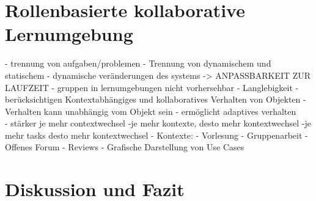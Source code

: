 \documentclass[conference]{IEEEtran}
\begin{document}
\section{Rollenbasierte kollaborative Lernumgebung}
- trennung von aufgaben/problemen
- Trennung von dynamischem und statischem
- dynamische veränderungen des systems -> ANPASSBARKEIT ZUR LAUFZEIT
	- gruppen in lernumgebungen nicht vorhersehbar
- Langlebigkeit
- berücksichtigen Kontextabhängiges und kollaboratives Verhalten von Objekten \cite{family}
- Verhalten kann unabhängig vom Objekt sein - ermöglicht adaptives verhalten\\
- stärker je mehr contextwechsel
	-je mehr kontexte, desto mehr kontextwechsel
		-je mehr tasks desto mehr kontextwechsel
- Kontexte:
	- Vorlesung
	- Gruppenarbeit
	- Offenes Forum
	- Reviews
- Grafische Darstellung von Use Cases




\section{Diskussion und Fazit}

{}



\end{document}
